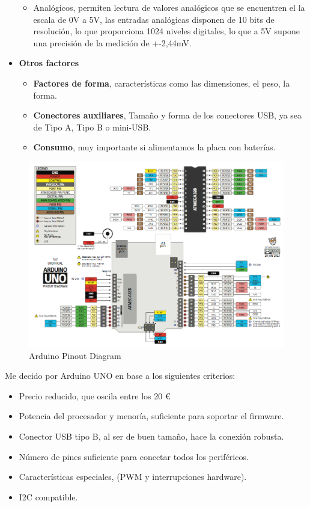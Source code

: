 \begin{itemize}
\begin{itemize}
		\item{Analógicos}, permiten lectura de valores analógicos que se encuentren el la escala de 0V a 5V, las entradas analógicas disponen de 10 bits de resolución, lo que proporciona 1024 niveles digitales, lo que a 5V supone una precisión de la medición de +-2,44mV. 
		
	\end{itemize}
	
	\item \textbf{Otros factores}
	\begin{itemize}
		\item \textbf{Factores de forma}, características como las dimensiones, el peso, la forma.
		\item \textbf{Conectores auxiliares}, Tamaño y forma de los conectores USB, ya sea de Tipo A, Tipo B o mini-USB. 
		\item \textbf{Consumo}, muy importante si alimentamos la placa con  baterías. 
		
	\end{itemize}	
\end{itemize}


\begin{figure}[h]
\centering
\includegraphics[width=0.8\linewidth]{../images/arduino_data}
\caption{Arduino Pinout Diagram}
\label{fig:arduino_data}
\end{figure}


\newpage

Me decido por Arduino UNO en base a los siguientes criterios:

\begin{itemize}
	\item{Precio reducido}, que oscila entre los 20 \euro
	\item{Potencia del procesador y menoría}, suficiente para soportar el firmware.
	\item{Conector USB tipo B}, al ser de buen tamaño, hace la conexión robusta.
	\item{Número de pines} suficiente para conectar todos los periféricos.
	\item{Características especiales}, (PWM y interrupciones hardware). 
	\item{I2C} compatible. 
\end{itemize}


